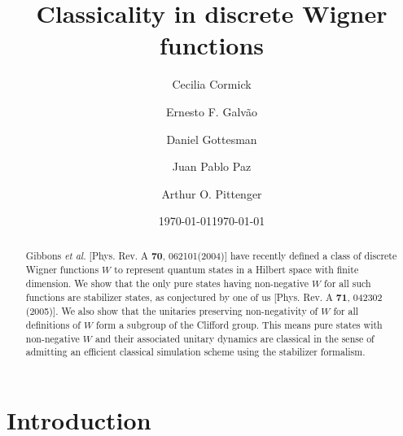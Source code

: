 \documentclass[aps,twocolumn,showpacs,nofootinbib,superscriptaddress]{revtex4}
\begin{document}
\title{Classicality in discrete Wigner functions}

\author{Cecilia Cormick}

\author{Ernesto F. Galv\~{a}o}

\author{Daniel Gottesman}

\author{Juan Pablo Paz}

\author{Arthur O. Pittenger}

\date{\today}
\begin{abstract}
Gibbons \textit{et al.} [Phys. Rev. A \textbf{70}, 062101(2004)]
have recently defined a class of discrete Wigner functions $W$ to
represent quantum states in a Hilbert space with finite dimension.
We show that the only pure states having non-negative $W$ for all
such functions are stabilizer states, as conjectured by one of us
[Phys. Rev. A \textbf{71}, 042302 (2005)]. We also show that the
unitaries preserving non-negativity of $W$ for all definitions of
$W$ form a subgroup of the Clifford group. This means pure states
with non-negative $W$ and their associated unitary dynamics are
classical in the sense of admitting an efficient classical
simulation scheme using the stabilizer formalism.

\end{abstract}
\date{\today}
\maketitle


\section{Introduction}
\end{document}
